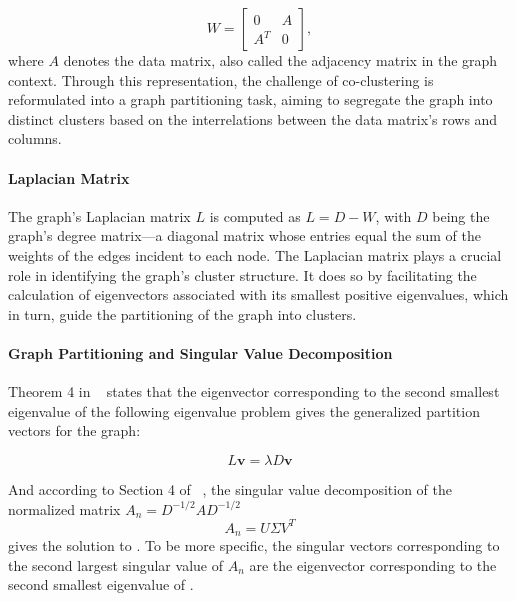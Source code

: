 \documentclass[journal]{IEEEtran}
\renewcommand{\cite}[1]{~\autocite{#1}}
\begin{document}
$$ W = \begin{bmatrix} 0 & A \\ A^T & 0 \end{bmatrix}, $$
where $A$ denotes the data matrix, also called the adjacency matrix in the graph context.
Through this representation, the challenge of co-clustering is reformulated into a graph partitioning task, aiming to segregate the graph into distinct clusters based on the interrelations between the data matrix's rows and columns.

\paragraph{Laplacian Matrix}

The graph's Laplacian matrix $L$ is computed as $L=D-W$, with $D$ being the graph's degree matrix—a diagonal matrix whose entries equal the sum of the weights of the edges incident to each node. The Laplacian matrix plays a crucial role in identifying the graph's cluster structure. It does so by facilitating the calculation of eigenvectors associated with its smallest positive eigenvalues, which in turn, guide the partitioning of the graph into clusters.

\paragraph{Graph Partitioning and Singular Value Decomposition}

Theorem 4 in \cite{dhillon2001CoclusteringDocumentsWords} states that the eigenvector corresponding to the second smallest eigenvalue of the following eigenvalue problem gives the generalized partition vectors for the graph:

\begin{equation}
  L \mathbf{v} = \lambda D \mathbf{v}
  \label{eq:eigenvalue_problem}
\end{equation}

And according to Section 4 of \cite{dhillon2001CoclusteringDocumentsWords}, the singular value decomposition of the normalized matrix $A_n = D^{-1/2} A D^{-1/2}$
$$A_n = U \Sigma V^T$$
gives the solution to . To be more specific, the singular vectors corresponding to the second largest singular value of $A_n$ are the eigenvector corresponding to the second smallest eigenvalue of .
\end{document}
